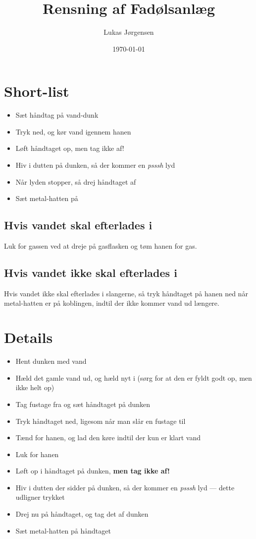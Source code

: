 

\title{Rensning af Fadølsanlæg}
\date{\today}
\author{Lukas Jørgensen}



\maketitle

\section{Short-list}

\begin{itemize}
  \item Sæt håndtag på vand-dunk
  \item Tryk ned, og kør vand igennem hanen
  \item Løft håndtaget op, men tag ikke af!
  \item Hiv i dutten på dunken, så der kommer en \textit{psssh} lyd
  \item Når lyden stopper, så drej håndtaget af
  \item Sæt metal-hatten på
\end{itemize}

\subsection{Hvis vandet skal efterlades i}
Luk for gassen ved at dreje på gasflasken og tøm hanen for gas.

\subsection{Hvis vandet ikke skal efterlades i}
Hvis vandet ikke skal efterlades i slangerne, så tryk håndtaget på
hanen ned når metal-hatten er på koblingen, indtil der ikke kommer
vand ud længere.

\section{Details}
\begin{itemize}
  \item Hent dunken med vand
  \item Hæld det gamle vand ud, og hæld nyt i (sørg for at den er
    fyldt godt op, men ikke helt op)
  \item Tag fustage fra og sæt håndtaget på dunken
  \item Tryk håndtaget ned, ligesom når man slår en fustage til
  \item Tænd for hanen, og lad den køre indtil der kun er klart vand
  \item Luk for hanen
  \item Løft op i håndtaget på dunken, \textbf{men tag ikke af!}
  \item Hiv i dutten der sidder på dunken, så der kommer en
    \textit{psssh} lyd --- dette udligner trykket
  \item Drej nu på håndtaget, og tag det af dunken
  \item Sæt metal-hatten på håndtaget
\end{itemize}

